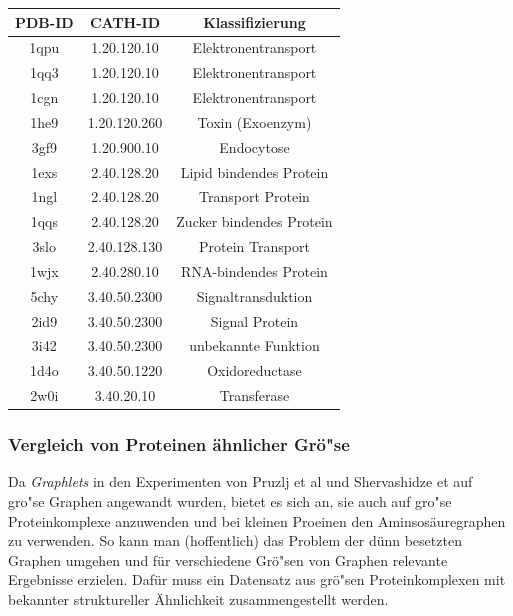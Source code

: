 \documentclass{report}
\begin{document}
\begin{tabular}{ | c || c | c |}

\hline
PDB-ID & CATH-ID        & Klassifizierung      \\ \hline
1qpu   & 1.20.120.10 & Elektronentransport     \\ \hline
1qq3   & 1.20.120.10 & Elektronentransport     \\ \hline
1cgn   & 1.20.120.10 & Elektronentransport     \\ \hline
1he9   & 1.20.120.260& Toxin (Exoenzym)        \\ \hline
3gf9   & 1.20.900.10 & Endocytose              \\ \hline
1exs   & 2.40.128.20 & Lipid bindendes Protein \\ \hline
1ngl   & 2.40.128.20 & Transport Protein       \\ \hline
1qqs   & 2.40.128.20 & Zucker bindendes Protein\\ \hline
3slo   & 2.40.128.130& Protein Transport       \\ \hline
1wjx   & 2.40.280.10 & RNA-bindendes Protein   \\ \hline
5chy   & 3.40.50.2300& Signaltransduktion      \\ \hline
2id9   & 3.40.50.2300& Signal Protein          \\ \hline
3i42   & 3.40.50.2300& unbekannte Funktion     \\ \hline
1d4o   & 3.40.50.1220& Oxidoreductase          \\ \hline
2w0i   & 3.40.20.10  & Transferase             \\ 
\hline
\end{tabular}



\subsubsection{Vergleich von Proteinen \"ahnlicher Gr\"o"se}

Da \textit{Graphlets} in den Experimenten von Pruzlj et al und Shervashidze et auf gro"se Graphen angewandt wurden, bietet es sich an, sie auch auf gro"se Proteinkomplexe anzuwenden und bei kleinen Proeinen den Aminsos\"auregraphen zu verwenden. So kann man (hoffentlich) das Problem der d\"unn besetzten Graphen umgehen und f\"ur verschiedene Gr\"o"sen von Graphen relevante Ergebnisse erzielen. Daf\"ur muss ein Datensatz aus gr\"o"sen Proteinkomplexen mit bekannter struktureller \"Ahnlichkeit zusammengestellt werden.
\end{document}
